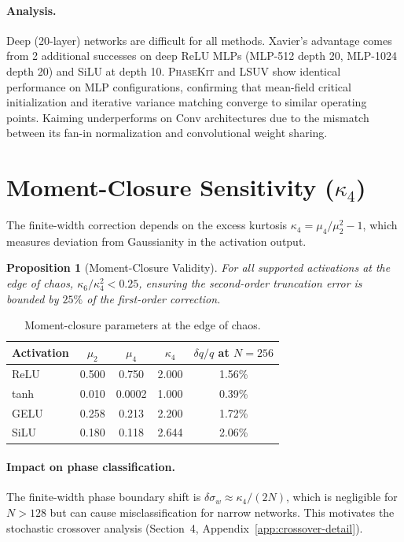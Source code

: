 \documentclass[10pt]{article}
\newcommand{\ToolName}{\textsc{PhaseKit}}
\newtheorem{proposition}[theorem]{Proposition}
\begin{document}
\paragraph{Analysis.}
Deep (20-layer) networks are difficult for all methods.
Xavier's advantage comes from 2 additional successes on deep ReLU MLPs (MLP-512 depth 20, MLP-1024 depth 20) and SiLU at depth 10.
\ToolName{} and LSUV show identical performance on MLP configurations, confirming that mean-field critical initialization and iterative variance matching converge to similar operating points.
Kaiming underperforms on Conv architectures due to the mismatch between its fan-in normalization and convolutional weight sharing.
\section{Moment-Closure Sensitivity ($\kappa_4$)}
\label{app:kappa4}

The finite-width correction depends on the excess kurtosis $\kappa_4 = \mu_4/\mu_2^2 - 1$,
which measures deviation from Gaussianity in the activation output.

\begin{proposition}[Moment-Closure Validity]
\label{prop:kappa4-validity}
For all supported activations at the edge of chaos, $\kappa_6/\kappa_4^2 < 0.25$, ensuring the second-order truncation error is bounded by $25\%$ of the first-order correction.
\end{proposition}

\begin{table}[h]
\centering
\caption{Moment-closure parameters at the edge of chaos.}
\label{tab:kappa4}
\small
\begin{tabular}{@{}lcccc@{}}
\toprule
\textbf{Activation} & $\mu_2$ & $\mu_4$ & $\kappa_4$ & $\delta q/q$ at $N\!=\!256$ \\
\midrule
ReLU  & 0.500 & 0.750 & 2.000 & 1.56\% \\
tanh  & 0.010 & 0.0002 & 1.000 & 0.39\% \\
GELU  & 0.258 & 0.213 & 2.200 & 1.72\% \\
SiLU  & 0.180 & 0.118 & 2.644 & 2.06\% \\
\bottomrule
\end{tabular}
\end{table}

\paragraph{Impact on phase classification.}
The finite-width phase boundary shift is $\delta\sigma_w \approx \kappa_4/(2N)$, which is negligible for $N > 128$ but can cause misclassification for narrow networks.
This motivates the stochastic crossover analysis (Section~4, Appendix~\ref{app:crossover-detail}).
\end{document}
